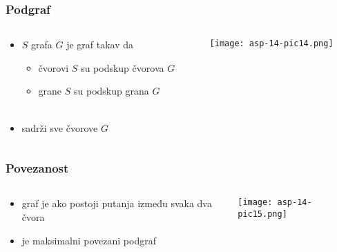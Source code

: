 \documentclass[compress,aspectratio=169]{beamer}
\begin{document}
\begin{frame}[fragile]
  \frametitle{Podgraf}
  \begin{columns}
    \begin{column}[t]{6cm}
      \begin{itemize}
        \item {} $S$ grafa $G$ je graf takav da
        \begin{itemize}
          \item čvorovi $S$ su podskup čvorova $G$
          \item grane $S$ su podskup grana $G$ \\ \ \\
        \end{itemize}
        \item {} sadrži sve čvorove $G$
      \end{itemize}
    \end{column}
    \begin{column}[t]{6cm}
      \begin{center}
        \texttt{[image: asp-14-pic14.png]}
      \end{center}
    \end{column}
  \end{columns}
\end{frame}

\begin{frame}[fragile]
  \frametitle{Povezanost}
  \begin{columns}
    \begin{column}[t]{6cm}
      \begin{itemize}
        \item graf je  ako postoji putanja između svaka 
          dva čvora
        \item {} je maksimalni povezani podgraf
      \end{itemize}
    \end{column}
    \begin{column}[t]{6cm}
      \begin{center}
        \texttt{[image: asp-14-pic15.png]}
      \end{center}
    \end{column}
  \end{columns}
\end{frame}
\end{document}
